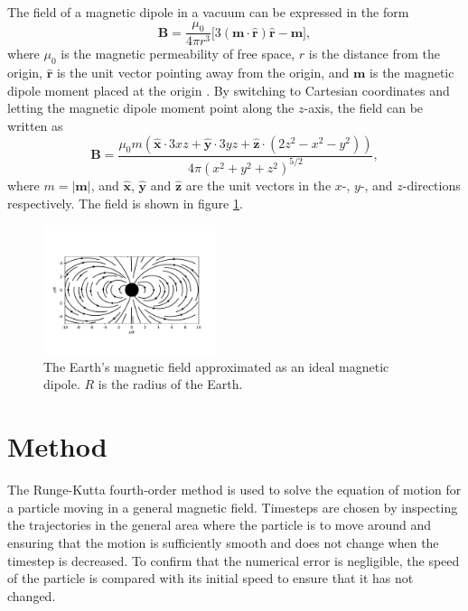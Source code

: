 \documentclass[5p,sort&compress]{elsarticle}
\begin{document}
The field of a magnetic dipole in a vacuum can be expressed in the form
\begin{equation}
\bm{B} = \frac{\mu_0}{4\pi r^3} \big[3(\bm{m}\cdot\bm{\hat{r}})\bm{\hat{r}} - \bm{m} \big],
\label{eq:mag_dipole}
\end{equation}
where $\mu_0$ is the magnetic permeability of free space, $r$ is the distance from the origin, $\bm{\hat{r}}$ is the unit vector pointing away from the origin, and $\bm{m}$ is the magnetic dipole moment placed at the origin \cite[p.~255]{Griffiths2017}. By switching to Cartesian coordinates and letting the magnetic dipole moment point along the $z$-axis, the field can be written as
\begin{equation}
    \bm{B} = \frac{\mu_0 m (\bm{\hat{x}}\cdot3xz + \bm{\hat{y}}\cdot3yz + \bm{\hat{z}}\cdot(2z^2 -x^2 - y^2))}{4 \pi (x^2 + y^2 + z^2)^{5/2}},
\end{equation}
where $m = \left|\bm{m}\right|$, and $\bm{\hat{x}}$, $\bm{\hat{y}}$ and $\bm{\hat{z}}$ are the unit vectors in the $x$-, $y$-, and $z$-directions respectively. The field is shown in figure \ref{fig:field}.

\begin{figure}[h]
    \centering
    \includegraphics[width=0.45\textwidth]{field.pdf}
    \caption{The Earth's magnetic field approximated as an ideal magnetic dipole. $R$ is the radius of the Earth.}
    \label{fig:field}
\end{figure}

\section{Method}
The Runge-Kutta fourth-order method is used to solve the equation of motion for a particle moving in a general magnetic field. Timesteps are chosen by inspecting the trajectories in the general area where the particle is to move around and ensuring that the motion is sufficiently smooth and does not change when the timestep is decreased. To confirm that the numerical error is negligible, the speed of the particle is compared with its initial speed to ensure that it has not changed.
\end{document}
